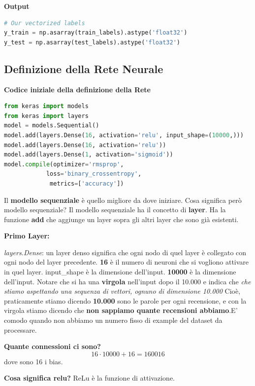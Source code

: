 \textbf{Output}
\begin{lstlisting}[language=Python]
# Our vectorized labels
y_train = np.asarray(train_labels).astype('float32')
y_test = np.asarray(test_labels).astype('float32')

\end{lstlisting}

\subsection{Definizione della Rete Neurale}
\textbf{Codice iniziale della definizione della Rete}

\begin{lstlisting}[language=Python]
    from keras import models
from keras import layers
model = models.Sequential()
model.add(layers.Dense(16, activation='relu', input_shape=(10000,)))
model.add(layers.Dense(16, activation='relu'))
model.add(layers.Dense(1, activation='sigmoid'))
model.compile(optimizer='rmsprop', 
            loss='binary_crossentropy',
             metrics=['accuracy'])
\end{lstlisting}

Il \textbf{modello sequenziale} è quello migliore da dove iniziare. Cosa
significa però modello sequenziale? Il modello sequenziale ha il concetto di
\textbf{layer}. Ha la funzione \textbf{add} che aggiunge un layer sopra gli
altri layer che sono già esistenti.

\textbf{Primo Layer:}

\textit{layers.Dense}: un layer denso significa che ogni nodo di quel layer è collegato con ogni nodo del layer precedente. \textbf{16} è il numero di neuroni che si vogliono attivare in quel layer.
input\_shape è la dimensione dell'input. \textbf{10000} è la dimensione dell'input. Notare che si ha una \textbf{virgola} nell'input dopo il 10.000 e indica che \textit{che stiamo aspettando una sequenza di vettori, ognuno di dimensione 10.000}
Cioè, praticamente stiamo dicendo \textbf{10.000} sono le parole per ogni recensione, e con la virgola stiamo dicendo che \textbf{non sappiamo quante recensioni abbiamo}.E' comodo quando non abbiamo un numero
fisso di example del dataset da processare.

\textbf{Quante connessioni ci sono?} \[16 \cdot 10000 + 16 = 160016\] dove sono 16 i bias.

\textbf{Cosa significa relu?} ReLu è la funzione di attivazione.


